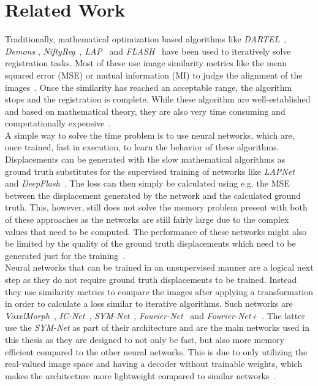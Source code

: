 \section{Related Work} \label{Sec:RelatedWork}
Traditionally, mathematical optimization based algorithms like \emph{DARTEL}~\cite{DARTEL}, \emph{Demons} \cite{Vercauteren2009}, \emph{NiftyReg}~\cite{NiftiReg}, \emph{LAP}~\cite{LAP} and \emph{FLASH}~\cite{FLASH} have been used to iteratively solve registration tasks. Most of these use image similarity metrics like the mean squared error (MSE) or mutual information (MI) to judge the alignment of the images~\cite{Fu2020}. Once the similarity has reached an acceptable range, the algorithm stops and the registration is complete. While these algorithm are well-established and based on mathematical theory, they are also very time consuming and computationally expensive~\cite{Chen2023}.\\
A simple way to solve the time problem is to use neural networks, which are, once trained, fast in execution, to learn the behavior of these algorithms. Displacements can be generated with the slow mathematical algorithms as ground truth substitutes for the supervised training of networks like \emph{LAPNet}~\cite{LAPNet} and \emph{DeepFlash}~\cite{DeepFlash}. The loss can then simply be calculated using e.g. the MSE between the displacement generated by the network and the calculated ground truth. This, however, still does not solve the memory problem present with both of these approaches as the networks are still fairly large due to the complex values that need to be computed. The performance of these networks might also be limited by the quality of the ground truth displacements which need to be generated just for the training~\cite{Chen2020,Zou2022}.\\
Neural networks that can be trained in an unsupervised manner are a logical next step as they do not require ground truth displacements to be trained. Instead they use similarity metrics to compare the images after applying a transformation in order to calculate a loss similar to iterative algorithms. Such networks are \emph{VoxelMorph}~\cite{Voxelmorph}, \emph{IC-Net}~\cite{IC-Net}, \emph{SYM-Net}~\cite{SYM-Net}, \emph{Fourier-Net}~\cite{Fourier-Net} and \emph{Fourier-Net+}~\cite{Fourier-Net+}. The latter use the \emph{SYM-Net} as part of their architecture and are the main networks used in this thesis as they are designed to not only be fast, but also more memory efficient compared to the other neural networks. This is due to only utilizing the real-valued image space and having a decoder without trainable weights, which makes the architecture more lightweight compared to similar networks~\cite{Fourier-Net,Fourier-Net+}.\\
